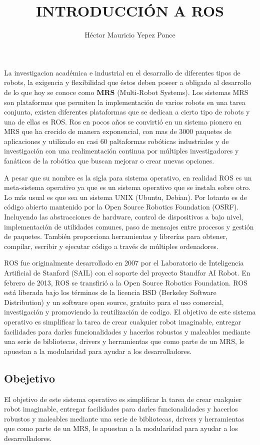 \documentclass[12pt,a4paper]{article}
\title{INTRODUCCIÓN A ROS}
\author{Héctor Mauricio Yepez Ponce}
\begin{document}
\maketitle

La investigacion académica e industrial en el desarrallo de diferentes tipos de robots, la exigencia y flexibilidad que éstos deben poseer a obligado al desarrollo de lo que hoy se conoce como \textbf{MRS} (Multi-Robot Systems). Los sistemas MRS son plataformas que permiten la implementación de varios robots en una tarea conjunta, existen diferentes plataformas que se dedican a cierto tipo de robots y una de ellas es  ROS.
Ros en pocos años se convirtió en un sistema pionero en MRS que ha crecido de manera exponencial, con mas de 3000 paquetes de aplicaciones y utilizado en casi 60 paltaformas robóticas industriales y de investigación con una realimentación continua por múltiples investigadores y fanáticos de la robótica que buscan mejorar o crear nuevas opciones.

A pesar que su nombre es la sigla para sistema operativo, en realidad ROS es un meta-sistema operativo ya que es un sistema operativo que se instala sobre otro. Lo más usual es que sea un sistema UNIX (Ubuntu, Debian). Por lotanto es de código abierto mantenido por la Open Source Robotics Foundation (OSRF). 
Incluyendo las abstracciones de hardware, control de dispositivos a bajo nivel, implementación de utilidades comunes, paso de mensajes entre procesos y gestión de paquetes. También proporciona herramientas y librerías para obtener, compilar, escribir y ejecutar código a través de múltiples ordenadores.

ROS fue originalmente desarrollado en 2007 por el Laboratorio de Inteligencia Artificial de Stanford (SAIL) con el soporte del proyecto Standfor AI Robot. En febrero de 2013, ROS se transfirió a la Open Source Robotics Foundation.
ROS está liberada bajo los términos de la licencia BSD (Berkeley Software Distribution) y un software open source, gratuito para el uso comercial, investigación y promoviendo la reutilización de codigo. 
El objetivo de este sistema operativo es simplificar la tarea de crear cualquier robot imaginable, entregar facilidades para darles funcionalidades y hacerlos robustos y maleables mediante una serie de bibliotecas, drivers y herramientas que como parte de un MRS, le apuestan a la modularidad para ayudar a los 
desarrolladores.
\subsection{Obejetivo}
El objetivo de este sistema operativo es simplificar la tarea de crear cualquier robot imaginable, entregar facilidades para darles funcionalidades y hacerlos robustos y maleables mediante una serie de bibliotecas, drivers y herramientas que como parte de un MRS, le apuestan a la modularidad para ayudar a los 
desarrolladores.
\end{document}
